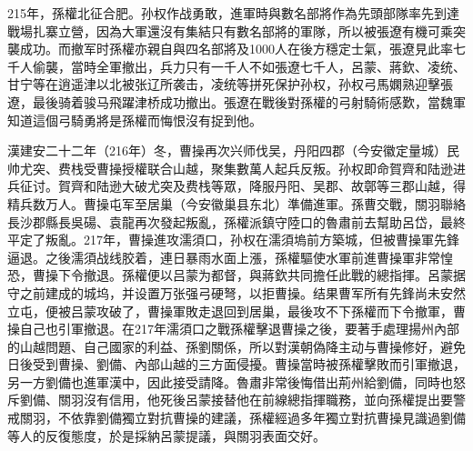 215年，孫權北征合肥。孙权作战勇敢，進軍時與數名部將作為先頭部隊率先到達戰場扎寨立營，因為大軍還沒有集結只有數名部將的軍隊，所以被張遼有機可乘突襲成功。而撤军时孫權亦親自與四名部將及1000人在後方穩定士氣，張遼見此率七千人偷襲，當時全軍撤出，兵力只有一千人不如張遼七千人，呂蒙、蔣欽、凌统、甘宁等在逍遥津以北被张辽所袭击，凌统等拼死保护孙权，孙权弓馬嫻熟迎擊張遼，最後骑着骏马飛躍津桥成功撤出。張遼在戰後對孫權的弓射騎術感歎，當魏軍知道這個弓騎勇將是孫權而悔恨沒有捉到他。

漢建安二十二年（216年）冬，曹操再次兴师伐吴，丹阳四郡（今安徽定量城）民帅尤突、费栈受曹操授權联合山越，聚集數萬人起兵反叛。孙权即命賀齊和陆逊进兵征讨。賀齊和陆逊大破尤突及费栈等眾，降服丹阳、吴郡、故鄣等三郡山越，得精兵数万人。曹操屯军至居巢（今安徽巢县东北）準備進軍。孫曹交戰，關羽聯絡長沙郡縣長吳碭、袁龍再次發起叛亂，孫權派鎮守陸口的魯肅前去幫助呂岱，最終平定了叛亂。217年，曹操進攻濡須口，孙权在濡須塢前方築城，但被曹操軍先鋒逼退。之後濡須战线胶着，連日暴雨水面上漲，孫權驅使水軍前進曹操軍非常惶恐，曹操下令撤退。孫權便以吕蒙为都督，與蔣欽共同擔任此戰的總指揮。呂蒙据守之前建成的城坞，并设置万张强弓硬弩，以拒曹操。结果曹军所有先鋒尚未安然立屯，便被吕蒙攻破了，曹操軍敗走退回到居巢，最後攻不下孫權而下令撤軍，曹操自己也引軍撤退。在217年濡須口之戰孫權擊退曹操之後，要著手處理揚州內部的山越問題、自己國家的利益、孫劉關係，所以對漢朝偽降主动与曹操修好，避免日後受到曹操、劉備、內部山越的三方面侵擾。曹操當時被孫權擊敗而引軍撤退，另一方劉備也進軍漢中，因此接受請降。魯肅非常後悔借出荊州給劉備，同時也怒斥劉備、關羽沒有信用，他死後呂蒙接替他在前線總指揮職務，並向孫權提出要警戒關羽，不依靠劉備獨立對抗曹操的建議，孫權經過多年獨立對抗曹操見識過劉備等人的反復態度，於是採納呂蒙提議，與關羽表面交好。

